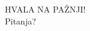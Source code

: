 \documentclass[aspectratio=1610]{beamer}
\begin{document}
	\begin{frame}{}
		\small
		\vspace{0.5cm}
		\begin{center}
			\Huge HVALA NA PAŽNJI!
			\\
			\Large Pitanja?
		\end{center}
	\end{frame}
	
\end{document}
